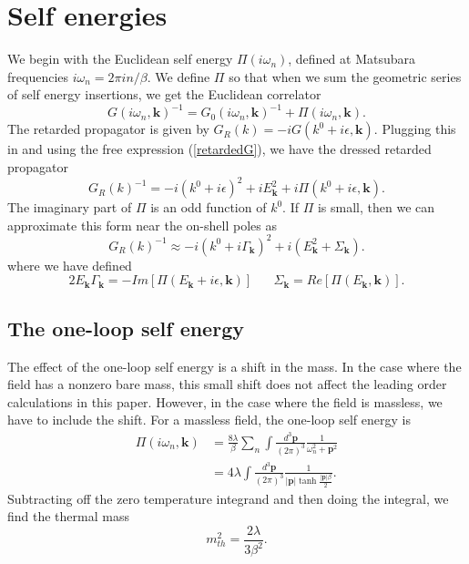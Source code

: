 \documentclass[12pt]{article}
\newcommand{\be}{\begin{equation}}
\newcommand{\ee}{\end{equation}}
\renewcommand{\k}{\mathbf{k}}
\newcommand{\p}{\mathbf{p}}
\begin{document}
\appendix

\section{Self energies}\label{selfenergy}
We begin with the Euclidean self energy $\Pi(i\omega_n)$, defined at Matsubara frequencies $i\omega_n = 2\pi in/\beta$. We define $\Pi$ so that when we sum the geometric series of self energy insertions, we get the Euclidean correlator
\be
G(i\omega_n,\k)^{-1} =G_0(i\omega_n,\k)^{-1} + \Pi(i\omega_n,\k). 
\ee
The retarded propagator is given by $G_R(k) = -iG(k^0+i\epsilon,\k)$. Plugging this in and using the free expression (\ref{retardedG}), we have the dressed retarded propagator
\be
G_R(k)^{-1} = -i(k^0+i\epsilon)^2 + iE_{\k}^2+i\Pi(k^0+i\epsilon,\k).
\ee
The imaginary part of $\Pi$ is an odd function of $k^0$. If $\Pi$ is small, then we can approximate this form near the on-shell poles as
\be
G_R(k)^{-1} \approx -i(k^0 + i\Gamma_\k)^2 + i(E_\k^2+\Sigma_\k).
\ee
where we have defined
\be
2E_\k \Gamma_\k = -Im[\Pi(E_\k +i\epsilon,\k)]\hspace{20pt} \Sigma_\k = Re[\Pi(E_\k,\k)].
\ee


\subsection{The one-loop self energy}\label{oneloop}
The effect of the one-loop self energy is a shift in the mass. In the case where the field has a nonzero bare mass, this small shift does not affect the leading order calculations in this paper. However, in the case where the field is massless, we have to include the shift. For a massless field, the one-loop self energy is
\begin{align}
\Pi(i\omega_n,\k) &= \frac{8\lambda}{\beta}\sum_n\int \frac{d^3\p}{(2\pi)^3}\frac{1}{\omega_n^2 + \p^2}\\
&=4\lambda \int \frac{d^3\p}{(2\pi)^3}\frac{1}{|\p| \tanh \frac{|\p|\beta}{2}}.
\end{align}
Subtracting off the zero temperature integrand and then doing the integral, we find the thermal mass
\be
m_{th}^2 = \frac{2\lambda}{3\beta^2}.
\ee
\end{document}
